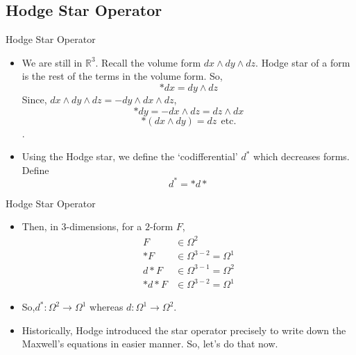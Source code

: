 \documentclass{beamer}
\theoremstyle{definition}
\begin{document}
	\subsection{Hodge Star Operator}
	\begin{frame}{Hodge Star Operator}{}
		\begin{itemize}
            \item<1-> {We are still in $\mathbb{R}^3$. Recall the volume form $dx \wedge dy \wedge dz$. Hodge star of a form is the rest of the terms in the volume form. So, 
            $$*dx = dy \wedge dz$$
            Since, $dx \wedge dy \wedge dz = -dy \wedge dx \wedge dz$,
            $$*dy = -dx \wedge dz = dz \wedge dx$$
            $$*(dx \wedge dy) = dz\ \ \text{etc.}$$.}
            \item<2-> {Using the Hodge star, we define the `codifferential' $d^*$ which decreases forms. Define
            $$d^* = *d*$$}
        \end{itemize}
	\end{frame}
	\begin{frame}{Hodge Star Operator}{}
		\begin{itemize}
            \item<1-> {Then, in $3$-dimensions, for a $2$-form $F$, 
            \begin{align*}
                F &\in \Omega^2\\
                *F &\in \Omega^{3-2} = \Omega^1\\
                d*F &\in \Omega^{3-1} = \Omega^2\\
                *d*F &\in \Omega^{3-2} = \Omega^1
\end{align*}}
            \item<2-> {So,$d^* : \Omega^2 \to \Omega^1$ whereas $d : \Omega^1 \to \Omega^2$.}
            \item<3-> {Historically, Hodge introduced the star operator precisely to write down the Maxwell's equations in easier manner. So, let's do that now.}
        \end{itemize}
	\end{frame}
\end{document}

